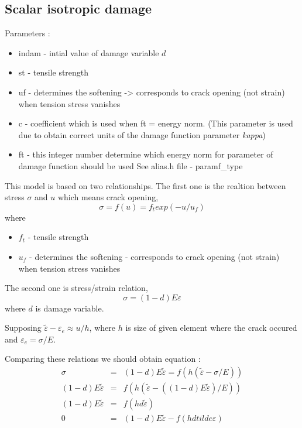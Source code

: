 \subsection{Scalar isotropic damage}
Parameters :\\
\begin{itemize}
\item {\sf indam} - intial value of damage variable $d$
\item {\sf st} - tensile strength
\item {\sf uf} - determines the softening -> corresponds to crack opening (not strain) when tension stress vanishes
\item {\sf c}  - coefficient which is used when {\sf ft} = energy norm. (This parameter is used due to obtain correct
                 units of the damage function parameter {\it kappa})
\item {\sf ft} - this integer number determine which energy norm for parameter of damage function should be used
                 See alias.h file - {\sf paramf\_type}
\end{itemize}

This model is based on two relationships. The first one is the realtion between stress $\sigma$ and $u$ which means
crack opening,
\begin{equation}
 \sigma=f(u)=f_t exp(-u/u_f)
\end{equation}
where
\begin{itemize}
\item $f_t$ - tensile strength
\item $u_f$ - determines the softening - corresponds to crack opening (not strain) when tension stress vanishes
\end{itemize}

The second one is stress/strain relation,
\begin{equation}
 \sigma=(1 - d) E \varepsilon
\end{equation}
where $d$ is damage variable.

Supposing $\tilde{\varepsilon} - \varepsilon_e \approx u/h$, where $h$ is size of given element where the crack occured and
$\varepsilon_e = \sigma/E$.

Comparing these relations we should obtain equation :
\begin{eqnarray}
\sigma&=&(1 - d) E \tilde{\varepsilon} = f(h(\tilde{\varepsilon}-\sigma/E))\\
(1 - d) E \tilde{\varepsilon} &=& f(h(\tilde{\varepsilon}-((1-d) E \tilde{\varepsilon})/E))\\
(1 - d) E \tilde{\varepsilon} &=& f(h d \tilde{\varepsilon})\\
0 &=& (1 - d) E \tilde{\varepsilon} - f(h d tilde{\varepsilon})
\end{eqnarray}

